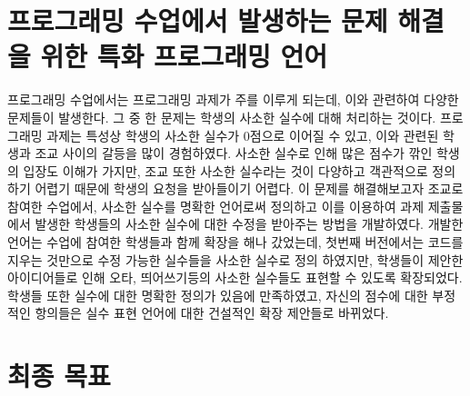 \documentclass[11pt]{article}
\begin{document}
\begin{spacing}{1.145}
\section{프로그래밍 수업에서 발생하는 문제 해결을 위한 특화 프로그래밍 언어}
%
프로그래밍 수업에서는 프로그래밍 과제가 주를 이루게 되는데, 이와 관련하여 다양한 문제들이 발생한다.
%
그 중 한 문제는 학생의 사소한 실수에 대해 처리하는 것이다.
%
프로그래밍 과제는 특성상 학생의 사소한 실수가 0점으로 이어질 수 있고, 이와 관련된 학생과 조교 사이의 갈등을 많이 경험하였다.
%
사소한 실수로 인해 많은 점수가 깎인 학생의 입장도 이해가 가지만, 조교 또한 사소한 실수라는 것이 다양하고 객관적으로 정의하기 어렵기 때문에 학생의 요청을 받아들이기 어렵다.
%
이 문제를 해결해보고자 조교로 참여한 수업에서, 사소한 실수를 명확한 언어로써 정의하고 이를 이용하여 과제 제출물에서 발생한 학생들의 사소한 실수에 대한 수정을 받아주는 방법을 개발하였다.
%
개발한 언어는 수업에 참여한 학생들과 함께 확장을 해나 갔었는데, 첫번째 버전에서는 코드를 지우는 것만으로 수정 가능한 실수들을 사소한 실수로 정의 하였지만, 학생들이 제안한 아이디어들로 인해 오타, 띄어쓰기등의 사소한 실수들도 표현할 수 있도록 확장되었다.
%
학생들 또한 실수에 대한 명확한 정의가 있음에 만족하였고, 자신의 점수에 대한 부정적인 항의들은 실수 표현 언어에 대한 건설적인 확장 제안들로 바뀌었다.




\clearpage



\section{최종 목표}







        

\end{spacing}
\end{document}
